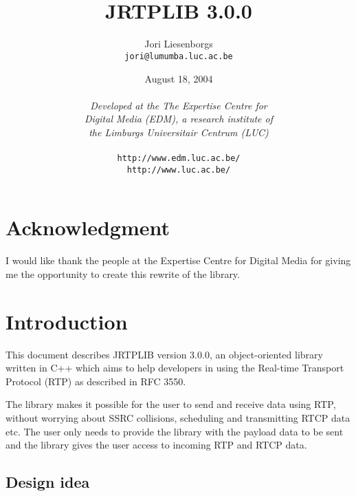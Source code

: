 \documentclass[12pt,a4paper]{article}
\newcommand{\jversion}{3.0.0}
\begin{document}
	\title{\ \vspace{3.5cm}\ \\{\bf JRTPLIB \jversion}}
	\author{Jori Liesenborgs\\{\tt jori@lumumba.luc.ac.be}}
	\date{August 18, 2004\\\vspace{0.5cm}\ \\
	      {\small{\em Developed at the The Expertise Centre for \\Digital Media (EDM),
	      a research institute of\\ the Limburgs Universitair Centrum (LUC)}\\\ \\
		  {\tt http://www.edm.luc.ac.be/}\\
		  {\tt http://www.luc.ac.be/}}}
	\maketitle
	
	\newpage
	\tableofcontents

\setlength{\parindent}{0cm}
\setlength{\parskip}{0.3cm}

	\newpage
	\section*{Acknowledgment}

		I would like thank the people at the Expertise Centre for Digital Media
		for giving me the opportunity to create this rewrite of the library.

	\newpage
	\section{Introduction}

		This document describes JRTPLIB version \jversion, an object-oriented
		library written in C++ which aims to help developers in using the 
		Real-time Transport Protocol (RTP) as described in RFC 3550.

		The library makes it possible for the user to send and receive data
		using RTP, without worrying about SSRC collisions, scheduling and
		transmitting RTCP data etc. The user only needs to provide the library
		with the payload data to be sent and the library gives the user access
		to incoming RTP and RTCP data.

		\subsection{Design idea}
\end{document}
